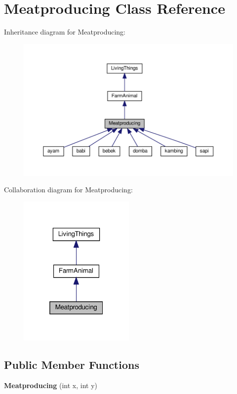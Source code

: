 \hypertarget{classMeatproducing}{}\section{Meatproducing Class Reference}
\label{classMeatproducing}


Inheritance diagram for Meatproducing\+:
\nopagebreak
\begin{figure}[H]
\begin{center}
\leavevmode
\includegraphics[width=350pt]{classMeatproducing__inherit__graph}
\end{center}
\end{figure}


Collaboration diagram for Meatproducing\+:
\nopagebreak
\begin{figure}[H]
\begin{center}
\leavevmode
\includegraphics[width=160pt]{classMeatproducing__coll__graph}
\end{center}
\end{figure}
\subsection*{Public Member Functions}
\begin{DoxyCompactItemize}
\item 
\mbox{\label{classMeatproducing_a5f7d6e507dd62044029052e805cd37dd}} 
{\bfseries Meatproducing} (int x, int y)
\end{DoxyCompactItemize}

